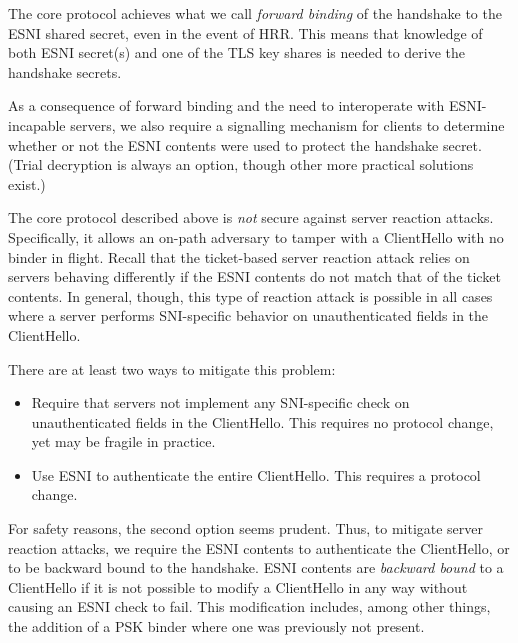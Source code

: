 \documentclass[twoside]{article}
\theoremstyle{definition}
\begin{document}

The core protocol achieves what we call \emph{forward binding} of the handshake to the ESNI 
shared secret, even in the event of HRR. This means that knowledge of both ESNI secret(s) 
and one of the TLS key shares is needed to derive the handshake secrets. 

As a consequence of forward binding and the need to interoperate with ESNI-incapable servers, 
we also require a signalling mechanism for clients to determine whether or not the ESNI contents were 
used to protect the handshake secret. (Trial decryption is always an option, though other more practical 
solutions exist.)

The core protocol described above is \emph{not} secure against server reaction attacks.
Specifically, it allows an on-path adversary to tamper with a ClientHello with no
binder in flight. Recall that the ticket-based server reaction attack relies on servers
behaving differently if the ESNI contents do not match that of the ticket contents.
In general, though, this type of reaction attack is possible in all cases where a server
performs SNI-specific behavior on unauthenticated fields in the ClientHello. 

There are at least two ways to mitigate this problem:
%
\begin{itemize}
  \item Require that servers not implement any SNI-specific check on unauthenticated fields
  in the ClientHello. This requires no protocol change, yet may be fragile in practice.
  \item Use ESNI to authenticate the entire ClientHello. This requires a protocol change.
\end{itemize}
%

For safety reasons, the second option seems prudent. Thus, to mitigate server reaction attacks,
we require the ESNI contents to authenticate the ClientHello, or to be backward bound to the 
handshake. ESNI contents are \emph{backward bound} to a ClientHello if it is not possible 
to modify a ClientHello in any way without causing an ESNI check to fail. This modification includes,
among other things, the addition of a PSK binder where one was previously not present.
\end{document}
